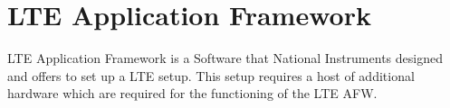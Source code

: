 \section{LTE Application Framework}\label{sec:LTEAFW}

LTE Application Framework is a Software that National Instruments designed and offers to set up a LTE setup. This setup requires a host of additional hardware which are required for the functioning of the LTE AFW.


